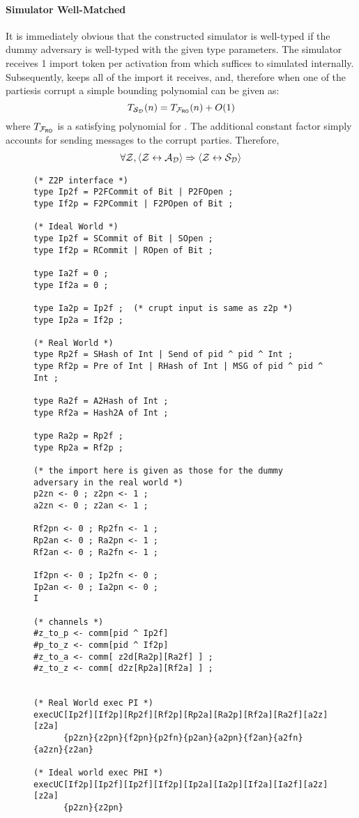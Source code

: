 \paragraph{Simulator Well-Matched}
It is immediately obvious that the constructed simulator is well-typed if the dummy adversary is well-typed with the given type parameters.
The simulator receives 1 import token per activation from \Environment which suffices to simulated \Fro internally. 
Subsequently, \Simulator keeps all of the import it receives, and, therefore when one of the partiesis corrupt a simple bounding polynomial can be given as:
\[
	T_{\mathcal{S}_{\mathcal{D}}}(n) = T_{\mathcal{F}_{{\mathsf {RO}}}}(n) + O(1)
\]
where $T_{\mathcal{F}_{{\mathsf {RO}}}}$ is a satisfying polynomial for \Fro. The additional constant factor simply accounts for sending messages to the corrupt parties.
Therefore,
\begin{gather}
	\forall \mathcal{Z}, \langle \mathcal{Z} \leftrightarrow \mathcal{A}_\mathcal{D} \rangle \Rightarrow \langle \mathcal{Z} \leftrightarrow \mathcal{S}_{\mathcal{D}} \rangle
\end{gather}


\begin{figure*}
\begin{lstlisting}[basicstyle=\BeraMonottFamily]
(* Z2P interface *)
type Ip2f = P2FCommit of Bit | P2FOpen ;
type If2p = F2PCommit | F2POpen of Bit ;

(* Ideal World *)
type Ip2f = SCommit of Bit | SOpen ;
type If2p = RCommit | ROpen of Bit ;

type Ia2f = 0 ;
type If2a = 0 ;

type Ia2p = Ip2f ;	(* crupt input is same as z2p *)
type Ip2a = If2p ;

(* Real World *)
type Rp2f = SHash of Int | Send of pid ^ pid ^ Int ;
type Rf2p = Pre of Int | RHash of Int | MSG of pid ^ pid ^ Int ;

type Ra2f = A2Hash of Int ;
type Rf2a = Hash2A of Int ;

type Ra2p = Rp2f ;
type Rp2a = Rf2p ;

(* the import here is given as those for the dummy adversary in the real world *)
p2zn <- 0 ; z2pn <- 1 ;
a2zn <- 0 ; z2an <- 1 ; 

Rf2pn <- 0 ; Rp2fn <- 1 ;
Rp2an <- 0 ; Ra2pn <- 1 ;
Rf2an <- 0 ; Ra2fn <- 1 ;

If2pn <- 0 ; Ip2fn <- 0 ;
Ip2an <- 0 ; Ia2pn <- 0 ;
I

(* channels *)
#z_to_p <- comm[pid ^ Ip2f]
#p_to_z <- comm[pid ^ If2p]
#z_to_a <- comm[ z2d[Ra2p][Ra2f] ] ;
#z_to_z <- comm[ d2z[Rp2a][Rf2a] ] ;


(* Real World exec PI *)
execUC[Ip2f][If2p][Rp2f][Rf2p][Rp2a][Ra2p][Rf2a][Ra2f][a2z][z2a]
	  {p2zn}{z2pn}{f2pn}{p2fn}{p2an}{a2pn}{f2an}{a2fn}{a2zn}{z2an}

(* Ideal world exec PHI *)
execUC[If2p][Ip2f][Ip2f][If2p][Ip2a][Ia2p][If2a][Ia2f][a2z][z2a]
	  {p2zn}{z2pn}






\end{lstlisting}
\end{figure*}
